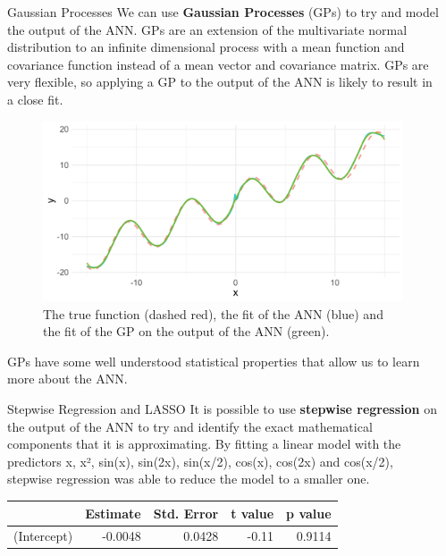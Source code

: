 \documentclass[final]{beamer}
\newlength{\sepwidth}
\newlength{\colwidth}
\newcommand{\separatorcolumn}{\begin{column}{\sepwidth}\end{column}}
\begin{document}
\begin{frame}[t]
\begin{columns}[t]
		\separatorcolumn
		\begin{column}{\colwidth}
			\begin{block}{Gaussian Processes}
				We can use \textbf{Gaussian Processes} (GPs) to try and model the output of the ANN.
				GPs are an extension of the multivariate normal distribution to an infinite dimensional process with a mean function and covariance function instead of a mean vector and covariance matrix.
				GPs are very flexible, so applying a GP to the output of the ANN is likely to result in a close fit.
				\begin{figure}
					\centering
					\includegraphics[width=\textwidth]{images/gp-trained.pdf}
					\vspace*{-1cm}
					\caption{The true function (dashed red), the fit of the ANN (blue) and the fit of the GP on the output of the ANN (green).}
					\vspace*{-0.5cm}
				\end{figure}
				GPs have some well understood statistical properties that allow us to learn more about the ANN.
			\end{block}
			\begin{block}{Stepwise Regression and LASSO}
				It is possible to use \textbf{stepwise regression} on the output of the ANN to try and identify the exact mathematical components that it is approximating.
				By fitting a linear model with the predictors x, x², sin(x), sin(2x), sin(x/2), cos(x), cos(2x) and cos(x/2), stepwise regression was able to reduce the model to a smaller one. 
				\begin{table}[ht]
					\centering
					\begin{tabular}{rrrrr}
						\hline
						            & Estimate & Std. Error & t value & p value \\
						\hline
						(Intercept) & -0.0048  & 0.0428     & -0.11   & 0.9114  \\

\end{tabular}
\end{table}
\end{block}
\end{column}
\end{columns}
\end{frame}
\end{document}
